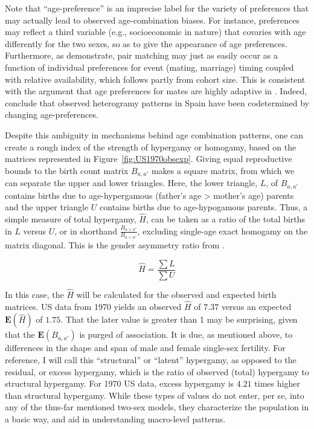 Note that ``age-preference'' is an imprecise label for the variety
of preferences that may actually lead to observed age-combination biases. For
instance, preferences may reflect a third variable (e.g., socioeconomic
in nature) that covaries with age differently for the two sexes, so as to give
the appearance of age preferences. Furthermore, as \citet{bergstrom1994sweden}
demonstrate, pair matching may just as easily occur as a function of individual
preferences for event (mating, marriage) timing coupled with relative
availability, which follows partly from cohort size. This is consistent with the
argument that age preferences
for mates are highly adaptive in \citet{bhrolchain2001flexibility}. Indeed,
\citet{esteve2009long} conclude that observed heterogramy patterns in Spain have been codetermined by changing
age-preferences.

Despite this ambiguity in mechanisms behind age combination patterns, one can
create a rough index of the strength of hypergamy or homogamy, based on the
matrices represented in Figure~\ref{fig:US1970obsexp}. Giving equal reproductive
bounds to the birth count matrix $B_{a,a'}$ makes a square matrix, from which we
can separate the upper and lower triangles. Here, the lower triangle, $L$,
of $B_{a,a'}$ contains births due to age-hypergamous (father's age > mother's
age) parents and the upper triangle $U$ contains births due to
age-hypogamous parents. Thus, a simple measure of total hypergamy, $\widehat{H}$, 
can be taken as a ratio of the total births in $L$ versus $U$, or in shorthand 
$\frac{B_{a>a'}}{B_{a<a'}}$, excluding single-age exact homogamy on the matrix
diagonal. This is the gender asymmetry ratio from \citet{esteve2009long}.

\begin{equation}
\widehat{H} = \frac{\sum L}{\sum U} 
\end{equation}

In this case, the $\widehat{H}$ will be calculated for the observed and expected
birth matrices. US data from 1970 yields an observed $\widehat{H}$ of $7.37$
versus an expected $\textbf{E}(\widehat{H})$ of $1.75$. That the later value is
greater than 1 may be surprising, given that the $\textbf{E}(B_{a,a'})$ is purged
of association. It is due, as mentioned above, to differences in the shape
and span of male and female single-sex fertility. For reference, I
will call this ``structural'' or ``latent'' hypergamy, as opposed to the
residual, or excess hypergamy, which is the ratio of observed (total) hypergamy to
structural hypergamy. For 1970 US data, excess hypergamy is $4.21$ times higher
than structural hypergamy. While these types of values do not enter, per se, 
into any of the thus-far mentioned two-sex models, they characterize the 
population in a basic way, and aid in understanding macro-level patterns. 

